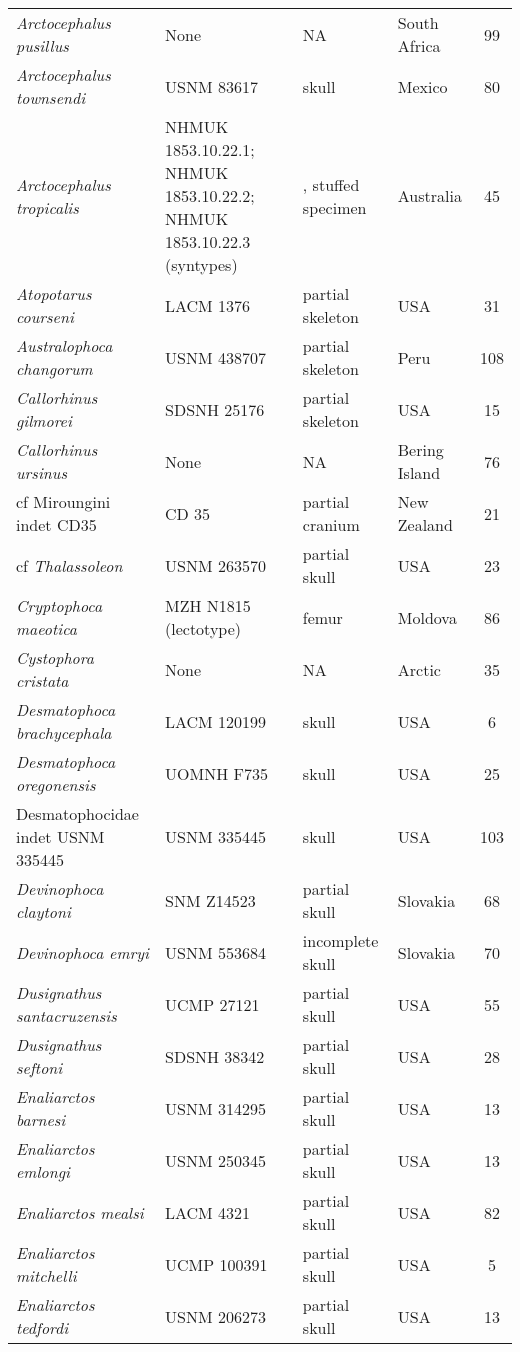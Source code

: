 \begin{longtable}{p{}p{}p{}lc}
\textit{Arctocephalus pusillus} & 	None & 	NA & South Africa & 	99\\
\textit{Arctocephalus townsendi} & 	USNM 83617 & skull & 	Mexico & 80\\
\textit{Arctocephalus tropicalis} & NHMUK 1853.10.22.1; NHMUK 1853.10.22.2; NHMUK 1853.10.22.3 (syntypes) & , stuffed specimen & 	Australia & 45\\
\textit{Atopotarus courseni} & 	LACM 1376 & partial skeleton & 	USA & 31\\
\textit{Australophoca changorum} & 	USNM 438707 & partial skeleton & 	Peru & 	108\\
\textit{Callorhinus gilmorei} & 	SDSNH 25176 & partial skeleton & 	USA & 15\\
\textit{Callorhinus ursinus} & 	None & 	NA & 	Bering Island & 76\\
cf Miroungini indet CD35	& CD 35 & 	partial cranium & 	New Zealand & 21\\
cf \textit{Thalassoleon} & USNM 263570 & partial skull & USA & 23\\
\textit{Cryptophoca maeotica} & MZH N1815 (lectotype)	& femur	& Moldova & 86\\
\textit{Cystophora cristata} & 	None & 	NA & 	Arctic & 35\\
\textit{Desmatophoca brachycephala} &	LACM 120199 & 	skull & 	USA & 6\\
\textit{Desmatophoca oregonensis} &	UOMNH F735 & 	skull & 	USA & 25\\
Desmatophocidae indet USNM 335445 &	USNM 335445 & 	skull & 	USA & 103\\
\textit{Devinophoca claytoni} &	SNM Z14523 & 	partial skull & 	Slovakia & 68\\
\textit{Devinophoca emryi} &	USNM 553684 & 	incomplete skull & 	Slovakia & 	70\\
\textit{Dusignathus santacruzensis} &	UCMP 27121 & 	partial skull & 	USA & 55\\
\textit{Dusignathus seftoni} &	SDSNH 38342 & 	partial skull & 	USA & 28\\
\textit{Enaliarctos barnesi} &	USNM 314295 & 	partial skull & 	USA & 13\\
\textit{Enaliarctos emlongi} &	USNM 250345 & 	partial skull & 	USA & 13\\
\textit{Enaliarctos mealsi} &	LACM 4321 & 	partial skull & 	USA & 82\\
\textit{Enaliarctos mitchelli} &	UCMP 100391 & 	partial skull & 	USA & 5\\
\textit{Enaliarctos tedfordi} &	USNM 206273 & 	partial skull & 	USA & 13\\

\end{longtable}
